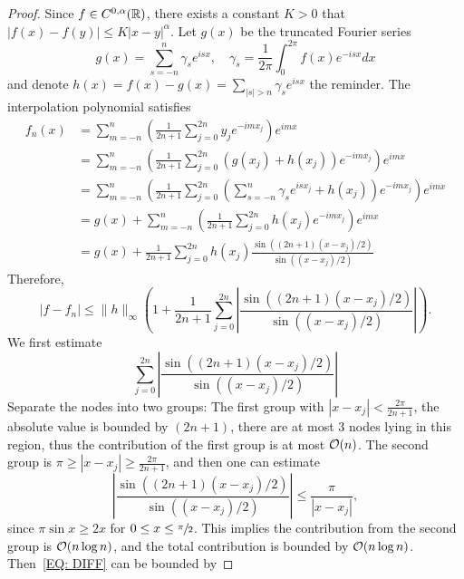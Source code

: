 \begin{proof}
    Since $f\in C^{0,\alpha}(\mathbb R)$, there exists a constant $K > 0$ that $|f(x) - f(y) |\le K |x - y|^{\alpha}$. Let $g(x)$ be the truncated Fourier series
    $$g(x) = \sum_{s = -n}^n \gamma_s e^{is x},\quad \gamma_s = \frac{1}{2\pi}\int_{0}^{2\pi} f(x) e^{-isx} dx$$
   and denote $h(x) = f(x)- g(x) = \sum_{|s| > n} \gamma_s e^{isx}$ the reminder. The interpolation polynomial satisfies
    \begin{equation}
        \begin{aligned}
            f_n(x)& = \sum_{m=-n}^n \left(\frac{1}{2n+1}\sum_{j=0}^{2n} y_j e^{-im x_j}\right) e^{im x}  \\
             &=\sum_{m=-n}^n \left(\frac{1}{2n+1}\sum_{j=0}^{2n} ( g(x_j) + h(x_j) ) e^{-im x_j}\right) e^{im x} \\
             &= \sum_{m=-n}^n \left(\frac{1}{2n+1}\sum_{j=0}^{2n} ( \sum_{s = -n}^n \gamma_s  e^{is x_j }+ h(x_j) ) e^{-im x_j}\right) e^{im x} \\
             &=g(x)+ \sum_{m=-n}^n \left(\frac{1}{2n+1}\sum_{j=0}^{2n} h(x_j) e^{-im x_j}\right)e^{im x} \\
             &=g(x)+ \frac{1}{2n+1} \sum_{j=0}^{2n} h(x_j) \frac{\sin((2n+1)(x-x_j)/2)}{\sin((x-x_j)/2)}
        \end{aligned}
    \end{equation}
    Therefore,
    \begin{equation}\label{EQ: DIFF}
        |f - f_n| \le \|h\|_{\infty} \left( 1 + \frac{1}{2n+1} \sum_{j=0}^{2n} \left|\frac{\sin((2n+1)(x-x_j)/2)}{\sin((x-x_j)/2)}\right|\right).
    \end{equation}
    We first estimate 
    $$\sum_{j=0}^{2n} \left|\frac{\sin((2n+1)(x-x_j)/2)}{\sin((x-x_j)/2)}\right|$$
    Separate the nodes into two groups: The first group with $|x - x_j| < \frac{2\pi}{2n+1}$, the absolute value is bounded by $(2n+1)$, there are at most $3$ nodes lying in this region, thus the contribution of the first group is at most $\mathcal O(n)$. The second group is $\pi\ge |x - x_j| \ge \frac{2\pi}{2n+1}$, and then one can estimate 
    \begin{equation}
        \left|\frac{\sin((2n+1)(x-x_j)/2)}{\sin((x-x_j)/2)}\right| \le \frac{\pi}{|x - x_j|},
    \end{equation}
    since $\pi \sin x \ge 2x $ for $0\le x\le \sfrac{\pi}{2}$. This implies the contribution from the second group is $\mathcal O(n\log n)$, and the total contribution is bounded by $\mathcal O(n\log n)$. Then~\eqref{EQ: DIFF} can be bounded by 

\end{proof}
